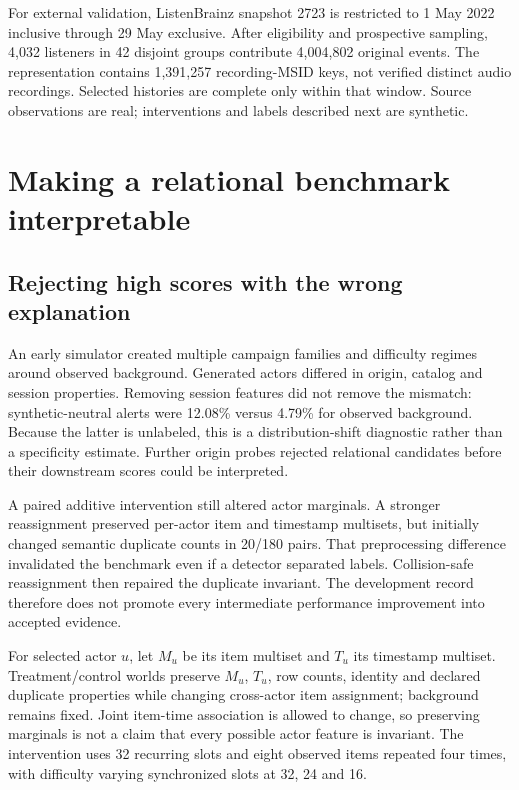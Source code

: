 \documentclass[sigconf,nonacm]{acmart}
\begin{document}
For external validation, ListenBrainz snapshot 2723 is restricted to 1 May 2022 inclusive through 29 May exclusive. After eligibility and prospective sampling, 4,032 listeners in 42 disjoint groups contribute 4,004,802 original events. The representation contains 1,391,257 recording-MSID keys, not verified distinct audio recordings. Selected histories are complete only within that window. Source observations are real; interventions and labels described next are synthetic.

\section{Making a relational benchmark interpretable}
\subsection{Rejecting high scores with the wrong explanation}
An early simulator created multiple campaign families and difficulty regimes around observed background. Generated actors differed in origin, catalog and session properties. Removing session features did not remove the mismatch: synthetic-neutral alerts were 12.08\% versus 4.79\% for observed background. Because the latter is unlabeled, this is a distribution-shift diagnostic rather than a specificity estimate. Further origin probes rejected relational candidates before their downstream scores could be interpreted.

A paired additive intervention still altered actor marginals. A stronger reassignment preserved per-actor item and timestamp multisets, but initially changed semantic duplicate counts in 20/180 pairs. That preprocessing difference invalidated the benchmark even if a detector separated labels. Collision-safe reassignment then repaired the duplicate invariant. The development record therefore does not promote every intermediate performance improvement into accepted evidence.

For selected actor $u$, let $M_u$ be its item multiset and $T_u$ its timestamp multiset. Treatment/control worlds preserve $M_u$, $T_u$, row counts, identity and declared duplicate properties while changing cross-actor item assignment; background remains fixed. Joint item-time association is allowed to change, so preserving marginals is not a claim that every possible actor feature is invariant. The intervention uses 32 recurring slots and eight observed items repeated four times, with difficulty varying synchronized slots at 32, 24 and 16.
\end{document}
